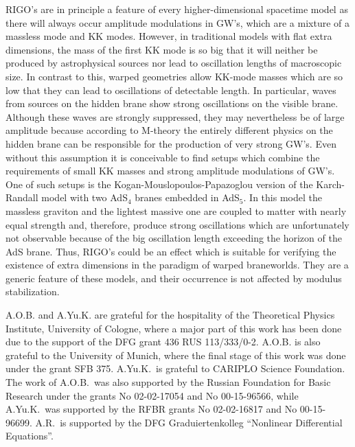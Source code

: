 \documentclass[a4paper,prl,twocolumn,amsmath,amssymb,showpacs]{revtex4}
\begin{document}
RIGO's are in principle a feature of every higher-dimensional spacetime model
as there will always occur amplitude modulations in GW's, which are a mixture
of a massless mode and KK modes. However, in traditional models with flat
extra dimensions, the mass of the first KK mode is so big that it will neither
be produced by astrophysical sources nor lead to oscillation lengths of
macroscopic size. In contrast to this, warped geometries allow KK-mode masses
which are so low that they can lead to oscillations of detectable length. In
particular, waves from sources on the hidden brane show strong oscillations on
the visible brane. Although these waves are strongly suppressed, they may
nevertheless be of large amplitude because according to M-theory the entirely
different physics on the hidden brane can be responsible for the production of
very strong GW's. Even without this assumption it is conceivable to find
set\-ups which combine the requirements of small KK masses and strong
amplitude modulations of GW's.  One of such set\-ups is the
Kogan-Mouslopoulos-Papazoglou version \cite{KMP} of the Karch-Randall model
\cite{KR} with two AdS$_4$ branes embedded in AdS$_5$.  In this model the
massless graviton and the lightest massive one are coupled to matter with
nearly equal strength and, therefore, produce strong oscillations which are
unfortunately not observable because of the big oscillation length exceeding
the horizon of the AdS brane. Thus, RIGO's could be an effect which is
suitable for verifying the existence of extra dimensions in the paradigm of
warped braneworlds. They are a generic feature of these models, and their
occurrence is not affected by modulus stabilization.
 
A.O.B. and A.Yu.K. are grateful for the 
hospitality of the Theoretical Physics Institute, 
University of Cologne, where  
a major part of this work has been done due to the support of the DFG grant  
436 RUS 113/333/0-2. A.O.B. is also grateful to the University of Munich,
where the final stage of this work was done under the grant SFB 375. 
A.Yu.K.\ is grateful to CARIPLO Science Foundation.  
The work of A.O.B.\ was also supported by the Russian  
Foundation for Basic Research under the grants No 02-02-17054 and  
No 00-15-96566, while  
A.Yu.K.\ was supported by the RFBR grants No 02-02-16817 and No 00-15-96699. 
 A.R.\ is supported by the DFG Graduiertenkolleg  
``Nonlinear Differential Equations''. 
 
\end{document}
